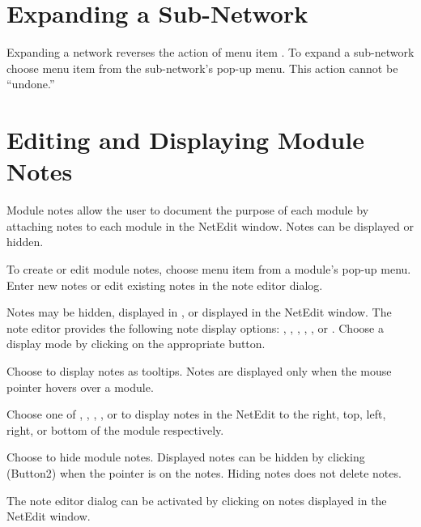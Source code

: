 

\section{Expanding a Sub-Network}
\label{sec:expsubnet}

Expanding a network reverses the action of menu item .  To expand a sub-network choose menu item
 from the sub-network's pop-up menu.
  This action cannot be ``undone.''


\section{Editing and Displaying Module Notes}
\label{sec:modnotes}

Module notes allow the user to document the purpose of
each module by attaching notes to each module in the NetEdit window.
Notes can be displayed or hidden.

To create or edit module notes, choose menu item  from
a module's pop-up menu. Enter new notes or edit existing notes in
the note editor dialog.

Notes may be hidden, displayed in , or displayed in the
NetEdit window.  The note editor provides the following note display
options: , , ,
, , or .  Choose a
display mode by clicking  on the appropriate button.

Choose  to display notes as tooltips.  Notes are
displayed only when the mouse pointer hovers over a module.

Choose one of , , ,
, or  to display notes in the
NetEdit to the right, top, left, right, or bottom of the module
respectively. 

Choose  to hide module notes.  Displayed notes can be
hidden by clicking \keyboard(Button2) when the pointer is on the
notes.  Hiding notes does not delete notes.

The note editor dialog can be activated by clicking 
on notes displayed in the NetEdit window.


